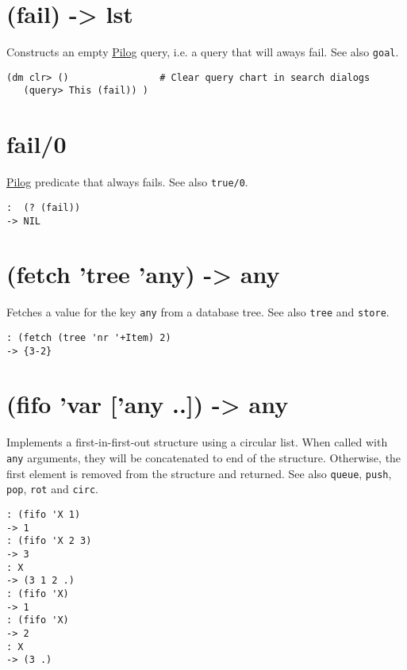 {{{{{ 
\section{(fail) -> lst}
\label{sec-8-1-6-3}


Constructs an empty \hyperref[ref.html-pilog]{Pilog} query, i.e. a query that
will aways fail. See also \texttt{goal}.


\begin{verbatim}
(dm clr> ()                # Clear query chart in search dialogs
   (query> This (fail)) )
\end{verbatim}

 
\section{fail/0}
\label{sec-8-1-6-4}


\hyperref[ref.html-pilog]{Pilog} predicate that always fails. See also
\texttt{true/0}.


\begin{verbatim}
:  (? (fail))
-> NIL
\end{verbatim}

 
\section{(fetch 'tree 'any) -> any}
\label{sec-8-1-6-5}


Fetches a value for the key \texttt{any} from a database tree. See also \texttt{tree}
and \texttt{store}.


\begin{verbatim}
: (fetch (tree 'nr '+Item) 2)
-> {3-2}
\end{verbatim}

 
\section{(fifo 'var ['any ..]) -> any}
\label{sec-8-1-6-6}


Implements a first-in-first-out structure using a circular list. When
called with \texttt{any} arguments, they will be concatenated to end of the
structure. Otherwise, the first element is removed from the structure
and returned. See also \texttt{queue}, \texttt{push}, \texttt{pop}, \texttt{rot} and \texttt{circ}.


\begin{verbatim}
: (fifo 'X 1)
-> 1
: (fifo 'X 2 3)
-> 3
: X
-> (3 1 2 .)
: (fifo 'X)
-> 1
: (fifo 'X)
-> 2
: X
-> (3 .)
\end{verbatim}

}}}}}
